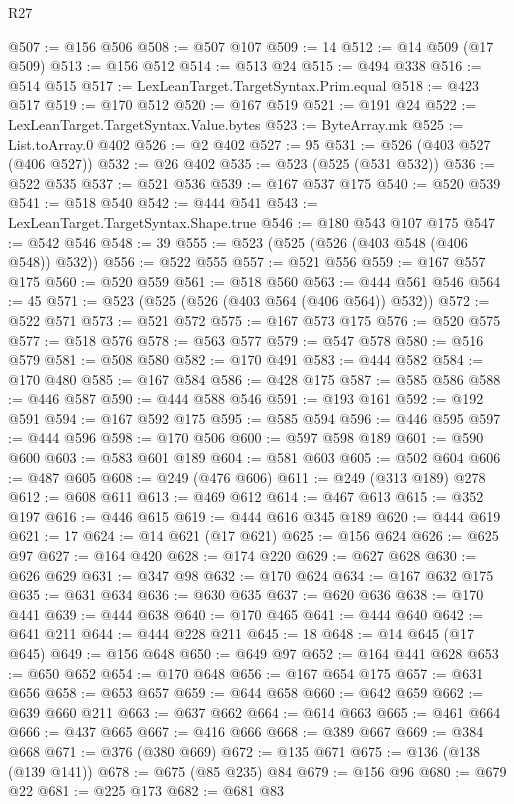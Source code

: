 \begin{lexlean}{R27}
\begin{coremodule}
@507 := @156 @506
@508 := @507 @107
@509 := 14
@512 := @14 @509 (@17 @509)
@513 := @156 @512
@514 := @513 @24
@515 := @494 @338
@516 := @514 @515
@517 := LexLeanTarget.TargetSyntax.Prim.equal
@518 := @423 @517
@519 := @170 @512
@520 := @167 @519
@521 := @191 @24
@522 := LexLeanTarget.TargetSyntax.Value.bytes
@523 := ByteArray.mk
@525 := List.toArray.{0} @402
@526 := @2 @402
@527 := 95
@531 := @526 (@403 @527 (@406 @527))
@532 := @26 @402
@535 := @523 (@525 (@531 @532))
@536 := @522 @535
@537 := @521 @536
@539 := @167 @537 @175
@540 := @520 @539
@541 := @518 @540
@542 := @444 @541
@543 := LexLeanTarget.TargetSyntax.Shape.true
@546 := @180 @543 @107 @175
@547 := @542 @546
@548 := 39
@555 := @523 (@525 (@526 (@403 @548 (@406 @548)) @532))
@556 := @522 @555
@557 := @521 @556
@559 := @167 @557 @175
@560 := @520 @559
@561 := @518 @560
@563 := @444 @561 @546
@564 := 45
@571 := @523 (@525 (@526 (@403 @564 (@406 @564)) @532))
@572 := @522 @571
@573 := @521 @572
@575 := @167 @573 @175
@576 := @520 @575
@577 := @518 @576
@578 := @563 @577
@579 := @547 @578
@580 := @516 @579
@581 := @508 @580
@582 := @170 @491
@583 := @444 @582
@584 := @170 @480
@585 := @167 @584
@586 := @428 @175
@587 := @585 @586
@588 := @446 @587
@590 := @444 @588 @546
@591 := @193 @161
@592 := @192 @591
@594 := @167 @592 @175
@595 := @585 @594
@596 := @446 @595
@597 := @444 @596
@598 := @170 @506
@600 := @597 @598 @189
@601 := @590 @600
@603 := @583 @601 @189
@604 := @581 @603
@605 := @502 @604
@606 := @487 @605
@608 := @249 (@476 @606)
@611 := @249 (@313 @189) @278
@612 := @608 @611
@613 := @469 @612
@614 := @467 @613
@615 := @352 @197
@616 := @446 @615
@619 := @444 @616 @345 @189
@620 := @444 @619
@621 := 17
@624 := @14 @621 (@17 @621)
@625 := @156 @624
@626 := @625 @97
@627 := @164 @420
@628 := @174 @220
@629 := @627 @628
@630 := @626 @629
@631 := @347 @98
@632 := @170 @624
@634 := @167 @632 @175
@635 := @631 @634
@636 := @630 @635
@637 := @620 @636
@638 := @170 @441
@639 := @444 @638
@640 := @170 @465
@641 := @444 @640
@642 := @641 @211
@644 := @444 @228 @211
@645 := 18
@648 := @14 @645 (@17 @645)
@649 := @156 @648
@650 := @649 @97
@652 := @164 @441 @628
@653 := @650 @652
@654 := @170 @648
@656 := @167 @654 @175
@657 := @631 @656
@658 := @653 @657
@659 := @644 @658
@660 := @642 @659
@662 := @639 @660 @211
@663 := @637 @662
@664 := @614 @663
@665 := @461 @664
@666 := @437 @665
@667 := @416 @666
@668 := @389 @667
@669 := @384 @668
@671 := @376 (@380 @669)
@672 := @135 @671
@675 := @136 (@138 (@139 @141))
@678 := @675 (@85 @235) @84
@679 := @156 @96
@680 := @679 @22
@681 := @225 @173
@682 := @681 @83

\end{coremodule}
\end{lexlean}
